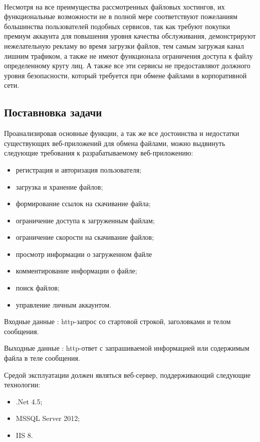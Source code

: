~\\Несмотря на все преимущества рассмотренных файловых хостингов, их функциональные возможности не в полной мере соответствуют пожеланиям большинства пользователей подобных сервисов, так как требуют покупки премиум аккаунта для повышения уровня качества обслуживания, демонстрируют нежелательную рекламу во время загрузки файлов, тем самым загружая канал лишним трафиком, а также не имеют функционала ограничения доступа к файлу определенному кругу лиц. А также все эти сервисы не предоставляют должного уровня безопасности, который требуется при обмене файлами в корпоративной сети.


\subsection{Поставновка задачи}
\label{sec:practice:itechart_characteristic:zadacha}

Проанализировав основные функции, а так же все достоинства и недостатки существующих веб-приложений для обмена файлами, можно выдвинуть следующие требования к разрабатываемому веб-приложению:
\begin{itemize}
  \item  регистрация и авторизация пользователя;
  \item  загрузка и хранение файлов;
  \item  формирование ссылок на скачивание файла;
  \item  ограничение доступа к загруженным файлам;
  \item  ограничение скорости на скачивание файлов;
  \item  просмотр информации о загруженном файле
  \item  комментирование информации о файле;
  \item  поиск файлов;
  \item  управление личным аккаунтом.
\end{itemize}

Входные данные : http-запрос со стартовой строкой, заголовками и телом сообщения.

Выходные данные : http-ответ с запрашиваемой информацией или содержимым файла в теле сообщения.

Средой эксплуатации должен являться веб-сервер, поддерживающий следующие технологии:
\begin{itemize}
  \item .Net 4.5;
  \item MSSQL Server 2012;
  \item IIS 8.
\end{itemize}
